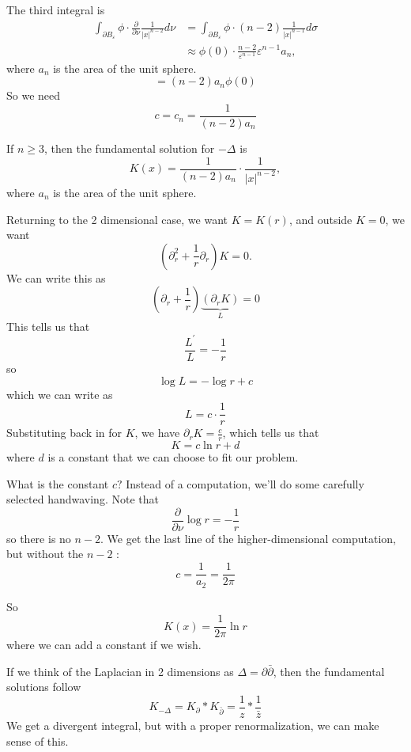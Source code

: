 The third integral is
$$
\begin{aligned}
\int_{\partial B_{\varepsilon}} \phi \cdot \frac{\partial}{\partial \nu} \frac{1}{|x|^{n-2}} d \nu &=\int_{\partial B_{\varepsilon}} \phi \cdot(n-2) \frac{1}{|x|^{n-1}} d \sigma\\
& \approx \phi(0)\cdot \frac{n-2}{\varepsilon^{n-1}} \varepsilon^{n-1} a_n,
\end{aligned}
$$
where $a_{n}$ is the area of the unit sphere.
$$
=(n-2) a_{n} \phi(0)
$$
So we need
$$
c=c_{n}=\frac{1}{(n-2) a_{n}}
$$

\begin{theorem}
If $n\ge 3$, then the fundamental solution for $-\Delta$ is 
\[
    K(x) = \frac{1}{(n-2)a_n} \cdot \frac{1}{|x|^{n-2}},
\]
where $a_n$ is the area of the unit sphere. 
\end{theorem}

Returning to the 2 dimensional case, we want $K= K(r)$, and outside $K=0$, we want 
\[
    (\partial_r^2 + \frac 1 r \partial _r ) K = 0.
\]
We can write this as
$$
\left(\partial_{r}+\frac{1}{r}\right) \underbrace{\left(\partial_{r} K\right)}_{L}=0
$$
This tells us that
$$
\frac{L^{\prime}}{L}=-\frac{1}{r}
$$
so
$$
\log L=-\log r+c
$$
which we can write as
$$
L=c \cdot \frac{1}{r}
$$
Substituting back in for $K$, we have $\partial_{r} K=\frac{c}{r}$, which tells us that
$$
K=c \ln r+d
$$
where $d$ is a constant that we can choose to fit our problem.

What is the constant $c ?$ Instead of a computation, we'll do some carefully selected handwaving. Note that
$$
\frac{\partial}{\partial \nu} \log r=-\frac{1}{r}
$$
so there is no $n-2$. We get the last line of the higher-dimensional computation, but without the $n-2$ :
$$
c=\frac{1}{a_{2}}=\frac{1}{2 \pi}
$$

So
$$
K(x)=\frac{1}{2 \pi} \ln r
$$
where we can add a constant if we wish.

\begin{remark}
    If we think of the Laplacian in 2 dimensions as $\Delta=\partial \bar{\partial}$, then the fundamental solutions follow
    $$
    K_{-\Delta}=K_{\partial} * K_{\bar{\partial}}=\frac{1}{z} * \frac{1}{\bar{z}}
    $$
    We get a divergent integral, but with a proper renormalization, we can make sense of this.
\end{remark}
